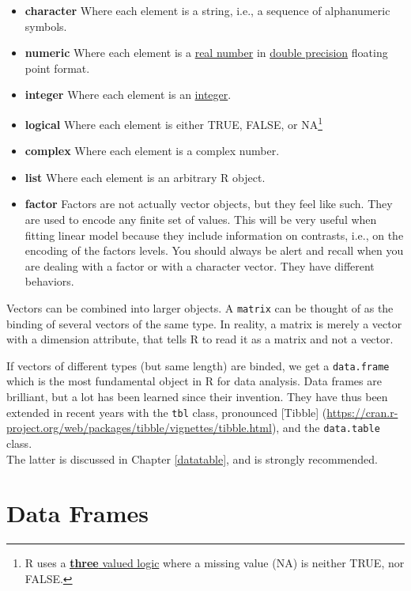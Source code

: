 \documentclass[]{book}
\providecommand{\tightlist}{%
  \setlength{\itemsep}{0pt}\setlength{\parskip}{0pt}}
\theoremstyle{definition}
\theoremstyle{definition}
\theoremstyle{definition}
\theoremstyle{remark}
\begin{document}
\begin{itemize}
\tightlist
\item
  \textbf{character} Where each element is a string, i.e., a sequence of
  alphanumeric symbols.
\item
  \textbf{numeric} Where each element is a
  \href{https://en.wikipedia.org/wiki/Real_number}{real number} in
  \href{https://en.wikipedia.org/wiki/Double-precision_floating-point_format}{double
  precision} floating point format.
\item
  \textbf{integer} Where each element is an
  \href{https://en.wikipedia.org/wiki/Integer}{integer}.
\item
  \textbf{logical} Where each element is either TRUE, FALSE, or
  NA\footnote{R uses a
    \href{https://en.wikipedia.org/wiki/Three-valued_logic}{\textbf{three}
    valued logic} where a missing value (NA) is neither TRUE, nor FALSE.}
\item
  \textbf{complex} Where each element is a complex number.
\item
  \textbf{list} Where each element is an arbitrary R object.
\item
  \textbf{factor} Factors are not actually vector objects, but they feel
  like such. They are used to encode any finite set of values. This will
  be very useful when fitting linear model because they include
  information on contrasts, i.e., on the encoding of the factors levels.
  You should always be alert and recall when you are dealing with a
  factor or with a character vector. They have different behaviors.
\end{itemize}

Vectors can be combined into larger objects. A \texttt{matrix} can be
thought of as the binding of several vectors of the same type. In
reality, a matrix is merely a vector with a dimension attribute, that
tells R to read it as a matrix and not a vector.

If vectors of different types (but same length) are binded, we get a
\texttt{data.frame} which is the most fundamental object in R for data
analysis. Data frames are brilliant, but a lot has been learned since
their invention. They have thus been extended in recent years with the
\texttt{tbl} class, pronounced {[}Tibble{]}
(\url{https://cran.r-project.org/web/packages/tibble/vignettes/tibble.html}),
and the \texttt{data.table} class.\\
The latter is discussed in Chapter \ref{datatable}, and is strongly
recommended.

\section{Data Frames}\label{data-frames}
\end{document}
